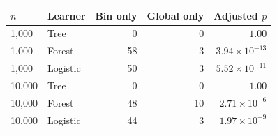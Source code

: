 \begin{tabular}{llrrr}
\toprule
$n$ & Learner & Bin only & Global only & Adjusted $p$ \\
\midrule
1,000 & Tree & 0 & 0 & $1.00$ \\
1,000 & Forest & 58 & 3 & $3.94\times10^{-13}$ \\
1,000 & Logistic & 50 & 3 & $5.52\times10^{-11}$ \\
10,000 & Tree & 0 & 0 & $1.00$ \\
10,000 & Forest & 48 & 10 & $2.71\times10^{-6}$ \\
10,000 & Logistic & 44 & 3 & $1.97\times10^{-9}$ \\
\bottomrule
\end{tabular}
